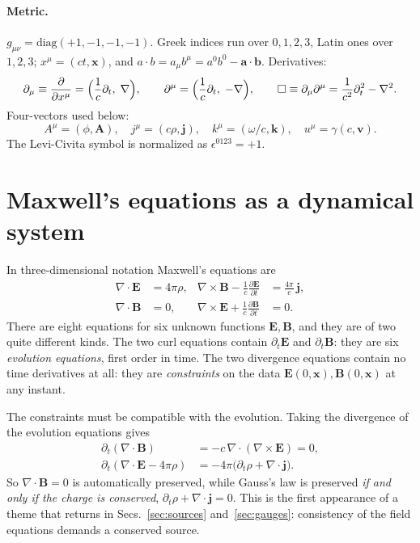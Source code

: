 \documentclass[11pt,a4paper]{book}
\begin{document}
\paragraph{Metric.} $g_{\mu\nu}=\mathrm{diag}(+1,-1,-1,-1)$. Greek indices run over
$0,1,2,3$, Latin ones over $1,2,3$; $x^\mu=(ct,\mathbf x)$, and
$a\cdot b=a_\mu b^\mu=a^0b^0-\mathbf a\cdot\mathbf b$. Derivatives:
\begin{equation}
\partial_\mu\equiv\frac{\partial}{\partial x^\mu}=\Bigl(\frac1c\partial_t,\;\nabla\Bigr),\qquad
\partial^\mu=\Bigl(\frac1c\partial_t,\;-\nabla\Bigr),\qquad
\Box\equiv\partial_\mu\partial^\mu=\frac1{c^2}\partial_t^2-\nabla^2 .
\end{equation}
Four-vectors used below:
\begin{equation}
A^\mu=(\phi,\mathbf A),\quad j^\mu=(c\rho,\mathbf j),\quad k^\mu=(\omega/c,\mathbf k),\quad
u^\mu=\gamma(c,\mathbf v).
\end{equation}
The Levi-Civita symbol is normalized as $\epsilon^{0123}=+1$.

\section{Maxwell's equations as a dynamical system}
\label{sec:maxwell}

In three-dimensional notation Maxwell's equations are
\begin{align}
\nabla\cdot\mathbf E&=4\pi\rho, &
\nabla\times\mathbf B-\frac1c\frac{\partial\mathbf E}{\partial t}&=\frac{4\pi}{c}\,\mathbf j,
\label{eq:maxwell-inh}\\
\nabla\cdot\mathbf B&=0, &
\nabla\times\mathbf E+\frac1c\frac{\partial\mathbf B}{\partial t}&=0 .
\label{eq:maxwell-hom}
\end{align}
There are eight equations for six unknown functions $\mathbf E,\mathbf B$, and they are
of two quite different kinds. The two curl equations contain $\partial_t\mathbf E$ and
$\partial_t\mathbf B$: they are six \emph{evolution equations}, first order in time.
The two divergence equations contain no time derivatives at all: they are
\emph{constraints} on the data $\mathbf E(0,\mathbf x),\mathbf B(0,\mathbf x)$ at any
instant.

The constraints must be compatible with the evolution. Taking the divergence of the
evolution equations gives
\begin{align}
\partial_t(\nabla\cdot\mathbf B)&=-c\,\nabla\cdot(\nabla\times\mathbf E)=0,\\
\partial_t(\nabla\cdot\mathbf E-4\pi\rho)&=-4\pi\bigl(\partial_t\rho+\nabla\cdot\mathbf j\bigr).
\label{eq:constraint-propagation}
\end{align}
So $\nabla\cdot\mathbf B=0$ is automatically preserved, while Gauss's law is preserved
\emph{if and only if the charge is conserved}, $\partial_t\rho+\nabla\cdot\mathbf j=0$.
This is the first appearance of a theme that returns in
Secs.~\ref{sec:sources} and~\ref{sec:gauges}: consistency of the field equations
demands a conserved source.
\end{document}
